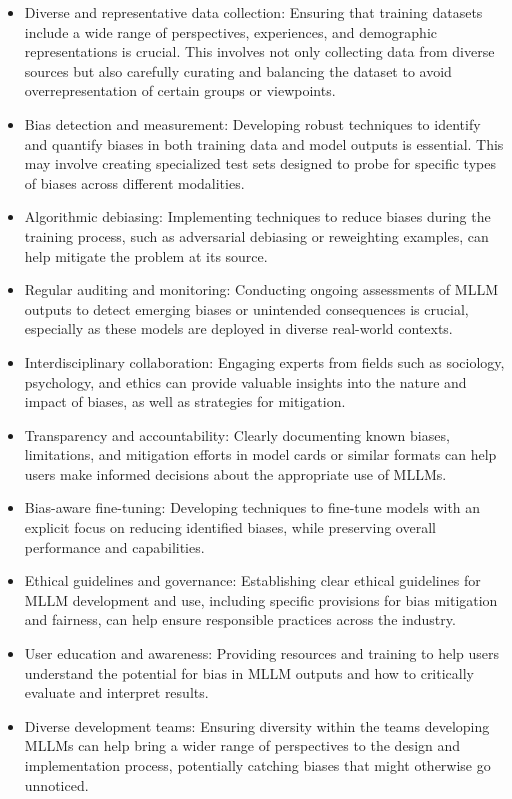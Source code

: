 \begin{itemize}
\item Diverse and representative data collection: Ensuring that training datasets include a wide range of perspectives, experiences, and demographic representations is crucial. This involves not only collecting data from diverse sources but also carefully curating and balancing the dataset to avoid overrepresentation of certain groups or viewpoints.

\item Bias detection and measurement: Developing robust techniques to identify and quantify biases in both training data and model outputs is essential. This may involve creating specialized test sets designed to probe for specific types of biases across different modalities.

\item Algorithmic debiasing: Implementing techniques to reduce biases during the training process, such as adversarial debiasing or reweighting examples, can help mitigate the problem at its source.

\item Regular auditing and monitoring: Conducting ongoing assessments of MLLM outputs to detect emerging biases or unintended consequences is crucial, especially as these models are deployed in diverse real-world contexts.

\item Interdisciplinary collaboration: Engaging experts from fields such as sociology, psychology, and ethics can provide valuable insights into the nature and impact of biases, as well as strategies for mitigation.

\item Transparency and accountability: Clearly documenting known biases, limitations, and mitigation efforts in model cards or similar formats can help users make informed decisions about the appropriate use of MLLMs.

\item Bias-aware fine-tuning: Developing techniques to fine-tune models with an explicit focus on reducing identified biases, while preserving overall performance and capabilities.

\item Ethical guidelines and governance: Establishing clear ethical guidelines for MLLM development and use, including specific provisions for bias mitigation and fairness, can help ensure responsible practices across the industry.

\item User education and awareness: Providing resources and training to help users understand the potential for bias in MLLM outputs and how to critically evaluate and interpret results.

\item Diverse development teams: Ensuring diversity within the teams developing MLLMs can help bring a wider range of perspectives to the design and implementation process, potentially catching biases that might otherwise go unnoticed.
\end{itemize}

